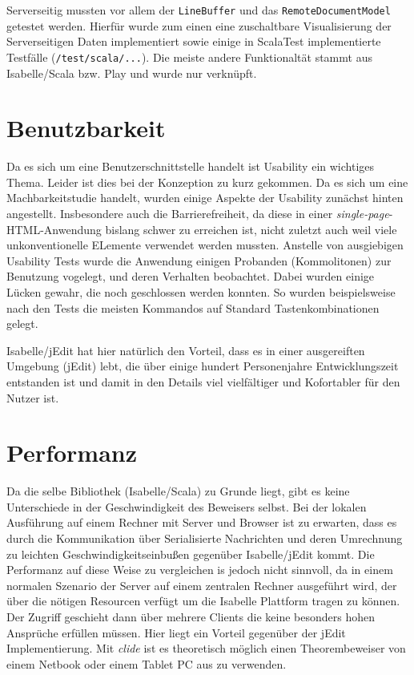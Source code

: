 Serverseitig mussten vor allem der \texttt{LineBuffer} und das \texttt{RemoteDocumentModel} getestet
werden. Hierfür wurde zum einen eine zuschaltbare Visualisierung der Serverseitigen Daten
implementiert sowie einige in ScalaTest implementierte Testfälle (\texttt{/test/scala/...}). Die
meiste andere Funktionaltät stammt aus Isabelle/Scala bzw. Play und wurde nur verknüpft.

\section{Benutzbarkeit}
\label{sec:usability}

Da es sich um eine Benutzerschnittstelle handelt ist Usability ein wichtiges Thema. Leider ist dies
bei der Konzeption zu kurz gekommen. Da es sich um eine Machbarkeitstudie handelt, wurden einige
Aspekte der Usability zunächst hinten angestellt. Insbesondere auch die Barrierefreiheit, da diese
in einer \textit{single-page}-HTML-Anwendung bislang schwer zu erreichen ist, nicht zuletzt auch
weil viele unkonventionelle ELemente verwendet werden mussten. Anstelle von ausgiebigen Usability
Tests wurde die Anwendung einigen Probanden (Kommolitonen) zur Benutzung vogelegt, und deren
Verhalten beobachtet. Dabei wurden einige Lücken gewahr, die noch geschlossen werden konnten. So
wurden beispielsweise nach den Tests die meisten Kommandos auf Standard Tastenkombinationen gelegt.

Isabelle/jEdit hat hier natürlich den Vorteil, dass es in einer ausgereiften Umgebung (jEdit) lebt,
die über einige hundert Personenjahre Entwicklungszeit entstanden ist und damit in den Details viel
vielfältiger und Kofortabler für den Nutzer ist.

\section{Performanz}

Da die selbe Bibliothek (Isabelle/Scala) zu Grunde liegt, gibt es keine Unterschiede in der
Geschwindigkeit des Beweisers selbst. Bei der lokalen Ausführung auf einem Rechner mit Server und
Browser ist zu erwarten, dass es durch die Kommunikation über Serialisierte Nachrichten und deren
Umrechnung zu leichten Geschwindigkeitseinbußen gegenüber Isabelle/jEdit kommt. Die Performanz auf
diese Weise zu vergleichen is jedoch nicht sinnvoll, da in einem normalen Szenario der Server auf
einem zentralen Rechner ausgeführt wird, der über die nötigen Resourcen verfügt um die Isabelle
Plattform tragen zu können. Der Zugriff geschieht dann über mehrere Clients die keine besonders
hohen Ansprüche erfüllen müssen. Hier liegt ein Vorteil gegenüber der jEdit Implementierung.
Mit \textit{clide} ist es theoretisch möglich einen Theorembeweiser von einem Netbook oder einem
Tablet PC aus zu verwenden.

